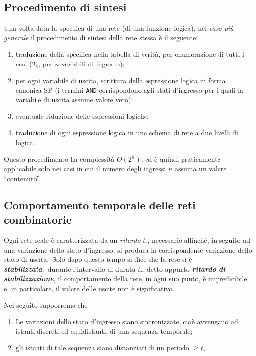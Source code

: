 \subsection{Procedimento di sintesi}

Una volta data la specifica di una rete (di una funzione logica), nel \textit{caso più generale} il procedimento di sintesi della rete stessa è il seguente:

\begin{enumerate}
    \item traduzione della specifica nella tabella di verità, per enumerazione di tutti i casi ($2_n$, per $n$ variabili di ingresso);
    \item per ogni variabile di uscita, scrittura della espressione logica in forma canonica SP (i termini \texttt{AND} corrispondono agli stati d'ingresso per i quali la variabile di uscita assume valore vero);
    \item eventuale riduzione delle espressioni logiche;
    \item traduzione di ogni espressione logica in uno schema di rete a due livelli di logica.
\end{enumerate}

\noindent Questo procedimento ha complessità $O(2^n)$, ed è quindi praticamente applicabile solo nei casi in cui il numero degli ingressi $n$ assuma un valore ``contenuto''.

\subsection{Comportamento temporale delle reti combinatorie}

Ogni rete reale è caratterizzata da un \textit{ritardo} $t_r$, necessario affinché, in seguito ad una variazione dello stato d'ingresso, si produca la corrispondente variazione dello stato di uscita.\
Solo dopo questo tempo si dice che la rete si è \textbf{\textit{stabilizzata}}:\ durante l'intervallo di durata $t_r$, detto appunto \textbf{\textit{ritardo di stabilizzazione}}, il comportamento della rete, in ogni suo punto, è impredicibile e, in particolare, il valore delle uscite non è significativo.

Nel seguito supporremo che

\begin{enumerate}
    \item Le variazioni dello stato d'ingresso siano sincronizzate, cioè avvengano ad istanti discreti ed equidistanti, di una sequenza temporale;
    \item gli istanti di tale sequenza siano distanziati di un periodo $\geq t_r$.
\end{enumerate}

